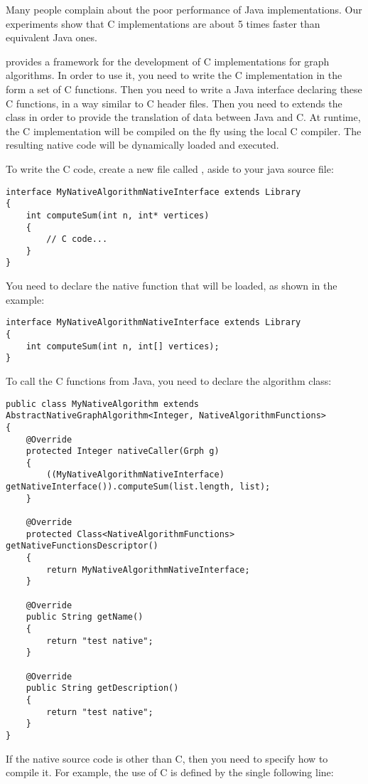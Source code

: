 \documentclass{article}
\begin{document}
Many people complain about the poor performance of Java implementations. Our experiments show that
 C implementations are about 5 times faster than equivalent Java ones.

\grph provides a framework for the development of C implementations for graph algorithms.
In order to use it, you need to write the C implementation in the form a set of C functions.
Then you need to write a Java interface declaring these C functions, in a way similar to C header files.
Then you need to extends the  class in order to provide
the translation of data between Java and C. At runtime, the C implementation will be compiled
on the fly using the local C compiler. The resulting native code will be dynamically loaded and executed.

To write the C code, 
create a new file called , aside to your java source file:

\begin{lstlisting}
interface MyNativeAlgorithmNativeInterface extends Library
{
	int computeSum(int n, int* vertices)
	{
		// C code...
	}
}
\end{lstlisting}


You need to declare the native function that will be loaded, as shown in the example:

\begin{lstlisting}
interface MyNativeAlgorithmNativeInterface extends Library
{
	int computeSum(int n, int[] vertices);
}
\end{lstlisting}

To call the C functions from Java,  you need to declare the algorithm class:

\begin{lstlisting}
public class MyNativeAlgorithm extends AbstractNativeGraphAlgorithm<Integer, NativeAlgorithmFunctions>
{
	@Override
	protected Integer nativeCaller(Grph g)
	{
		((MyNativeAlgorithmNativeInterface) getNativeInterface()).computeSum(list.length, list);
	}

	@Override
	protected Class<NativeAlgorithmFunctions> getNativeFunctionsDescriptor()
	{
		return MyNativeAlgorithmNativeInterface;
	}

	@Override
	public String getName()
	{
		return "test native";
	}

	@Override
	public String getDescription()
	{
		return "test native";
	}
}
\end{lstlisting}


If the native source code is other than C, then you need to specify how to compile it. For example,
the use of C is defined by the single following line:
\end{document}
